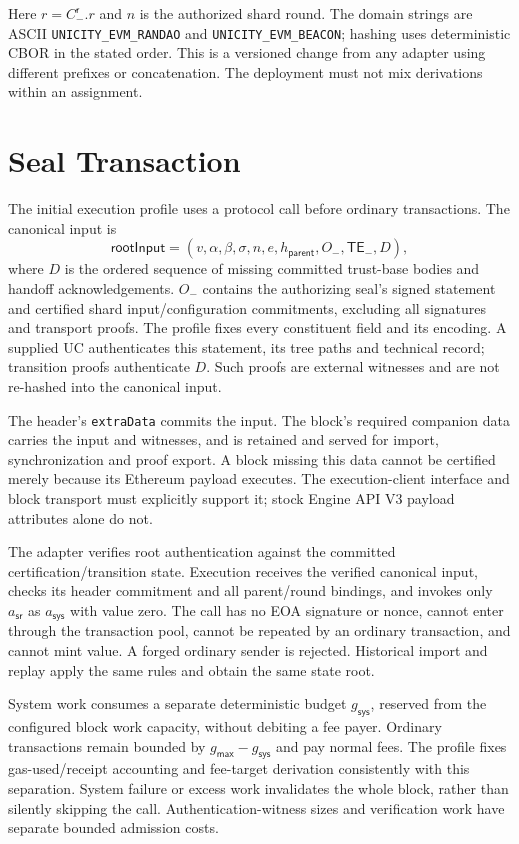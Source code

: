 Here $r=C^\mathsf{r}_-.r$ and $n$ is the authorized shard round. The domain strings are ASCII \texttt{UNICITY\_EVM\_RANDAO} and \texttt{UNICITY\_EVM\_BEACON}; hashing uses deterministic CBOR in the stated order. This is a versioned change from any adapter using different prefixes or concatenation. The deployment must not mix derivations within an assignment.

\section{Seal Transaction}\label{app:evm-seal-tx}

The initial execution profile uses a protocol call before ordinary transactions. The canonical input is
\[
 \mathsf{rootInput}=(v,\alpha,\beta,\sigma,n,e,h_\mathsf{parent},O_-,\mathsf{TE}_-,D),
\]
where $D$ is the ordered sequence of missing committed trust-base bodies and handoff acknowledgements. $O_-$ contains the authorizing seal's signed statement and certified shard input/configuration commitments, excluding all signatures and transport proofs. The profile fixes every constituent field and its encoding. A supplied UC authenticates this statement, its tree paths and technical record; transition proofs authenticate $D$. Such proofs are external witnesses and are not re-hashed into the canonical input.

The header's \texttt{extraData} commits the input. The block's required companion data carries the input and witnesses, and is retained and served for import, synchronization and proof export. A block missing this data cannot be certified merely because its Ethereum payload executes. The execution-client interface and block transport must explicitly support it; stock Engine API V3 payload attributes alone do not.

The adapter verifies root authentication against the committed certification/transition state. Execution receives the verified canonical input, checks its header commitment and all parent/round bindings, and invokes only $a_\mathsf{sr}$ as $a_\mathsf{sys}$ with value zero. The call has no EOA signature or nonce, cannot enter through the transaction pool, cannot be repeated by an ordinary transaction, and cannot mint value. A forged ordinary sender is rejected. Historical import and replay apply the same rules and obtain the same state root.

System work consumes a separate deterministic budget $g_\mathsf{sys}$, reserved from the configured block work capacity, without debiting a fee payer. Ordinary transactions remain bounded by $g_\mathsf{max}-g_\mathsf{sys}$ and pay normal fees. The profile fixes gas-used/receipt accounting and fee-target derivation consistently with this separation. System failure or excess work invalidates the whole block, rather than silently skipping the call. Authentication-witness sizes and verification work have separate bounded admission costs.


